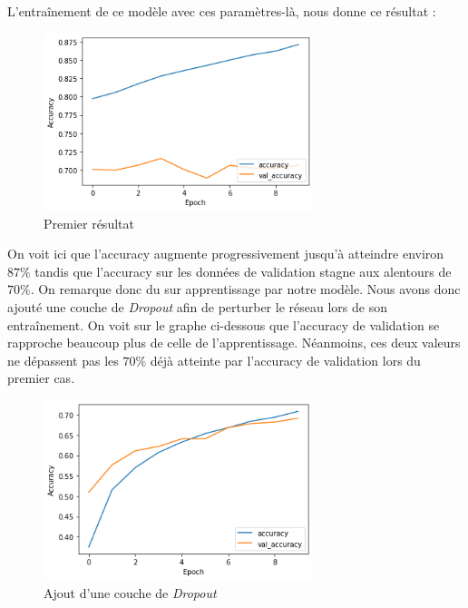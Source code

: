 \documentclass[12pt,titlepage]{article}
\begin{document}
L'entraînement de ce modèle avec ces paramètres-là, nous donne ce résultat :

\begin{figure}[!h]


\centering


\includegraphics[width=0.7\textwidth]{img/model_surapprentissage_acc.png}


\caption{Premier résultat}


\end{figure}

On voit ici que l'accuracy augmente progressivement jusqu'à atteindre environ $87\%$ tandis que l'accuracy sur les données de validation stagne aux alentours de $70\%$. On remarque donc du sur apprentissage par notre modèle. Nous avons donc ajouté une couche de \textit{Dropout} afin de perturber le réseau lors de son entraînement. On voit sur le graphe ci-dessous que l'accuracy de validation se rapproche beaucoup plus de celle de l'apprentissage. Néanmoins, ces deux valeurs ne dépassent pas les $70\%$ déjà atteinte par l'accuracy de validation lors du premier cas.

\begin{figure}[!h]

\centering

\includegraphics[width=0.7\textwidth]{img/model_dropout_acc.png}

\caption{Ajout d'une couche de \textit{Dropout}}


\end{figure}
\end{document}
